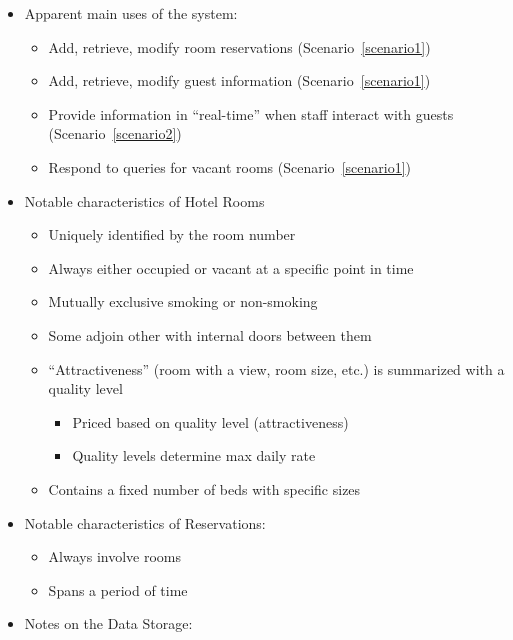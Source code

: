 \begin{itemize}
\item
  Apparent main uses of the system:

  \begin{itemize}
  \tightlist
  \item
    Add, retrieve, modify room reservations (Scenario~\ref{scenario1})
  \item
    Add, retrieve, modify guest information (Scenario~\ref{scenario1})
  \item
      Provide information in ``real-time'' when staff interact with guests (Scenario~\ref{scenario2})
  \item
    Respond to queries for vacant rooms (Scenario~\ref{scenario1})
  \end{itemize}
\item
  Notable characteristics of Hotel Rooms

  \begin{itemize}
  \tightlist
  \item
    Uniquely identified by the room number
  \item
    Always either occupied or vacant at a specific point in time
  \item
    Mutually exclusive smoking or non-smoking
  \item
    Some adjoin other with internal doors between them
  \item
    ``Attractiveness'' (room with a view, room size, etc.) is summarized
    with a quality level

    \begin{itemize}
    \tightlist
    \item
      Priced based on quality level (attractiveness)
    \item
      Quality levels determine max daily rate
    \end{itemize}
  \item
    Contains a fixed number of beds with specific sizes
  \end{itemize}
\item
  Notable characteristics of Reservations:

  \begin{itemize}
  \tightlist
  \item
    Always involve rooms
  \item
    Spans a period of time
  \end{itemize}
\item
  Notes on the Data Storage:


\end{itemize}
